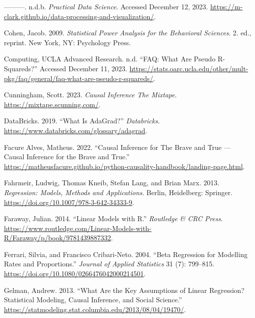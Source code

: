 \documentclass[
  letterpaper,
]{krantz}
\newlength{\cslhangindent}
\newlength{\cslentryspacingunit} %
\newenvironment{CSLReferences}[2] %
 {%
  \setlength{\parindent}{0pt}
  \ifodd #1
  \let\oldpar\par
  \def\par{\hangindent=\cslhangindent\oldpar}
  \fi
  \setlength{\parskip}{#2\cslentryspacingunit}
 }%
 {}
\begin{document}
\begin{CSLReferences}{1}{0}
\leavevmode{}%
---------. n.d.b. \emph{Practical {Data} {Science}}. Accessed December
12, 2023.
\url{https://m-clark.github.io/data-processing-and-visualization/}.

\leavevmode{}%
Cohen, Jacob. 2009. \emph{Statistical Power Analysis for the Behavioral
Sciences}. 2. ed., reprint. New York, NY: Psychology Press.

\leavevmode{}%
Computing, UCLA Advanced Research. n.d. {``{FAQ}: {What} Are Pseudo
{R}-Squareds?''} Accessed December 11, 2023.
\url{https://stats.oarc.ucla.edu/other/mult-pkg/faq/general/faq-what-are-pseudo-r-squareds/}.

\leavevmode{}%
Cunningham, Scott. 2023. \emph{Causal {Inference} {The} {Mixtape}}.
\url{https://mixtape.scunning.com/}.

\leavevmode{}%
DataBricks. 2019. {``What Is {AdaGrad}?''} \emph{Databricks}.
\url{https://www.databricks.com/glossary/adagrad}.

\leavevmode{}%
Facure Alves, Matheus. 2022. {``Causal {Inference} for {The} {Brave} and
{True} --- {Causal} {Inference} for the {Brave} and {True}.''}
\url{https://matheusfacure.github.io/python-causality-handbook/landing-page.html}.

\leavevmode{}%
Fahrmeir, Ludwig, Thomas Kneib, Stefan Lang, and Brian Marx. 2013.
\emph{Regression: {Models}, {Methods} and {Applications}}. Berlin,
Heidelberg: Springer. \url{https://doi.org/10.1007/978-3-642-34333-9}.

\leavevmode{}%
Faraway, Julian. 2014. {``Linear {Models} with {R}.''} \emph{Routledge
\& CRC Press}.
\url{https://www.routledge.com/Linear-Models-with-R/Faraway/p/book/9781439887332}.

\leavevmode{}%
Ferrari, Silvia, and Francisco Cribari-Neto. 2004. {``Beta {Regression}
for {Modelling} {Rates} and {Proportions}.''} \emph{Journal of Applied
Statistics} 31 (7): 799--815.
\url{https://doi.org/10.1080/0266476042000214501}.

\leavevmode{}%
Gelman, Andrew. 2013. {``What Are the Key Assumptions of Linear
Regression? {\textbar} {Statistical} {Modeling}, {Causal} {Inference},
and {Social} {Science}.''}
\url{https://statmodeling.stat.columbia.edu/2013/08/04/19470/}.


\end{CSLReferences}
\end{document}
